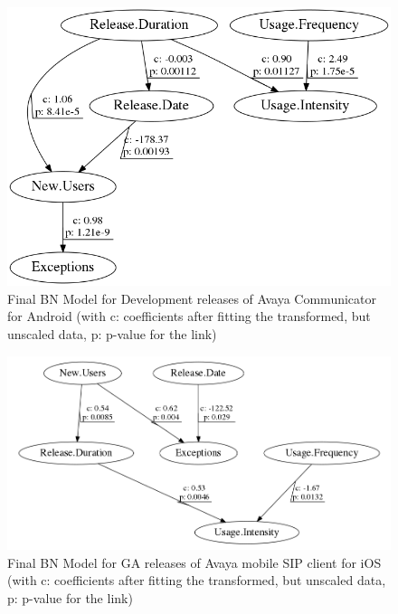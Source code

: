 \documentclass[smallextended]{svjour3}       %
\begin{document}
\begin{figure}[!t]
\centering
\includegraphics[width=0.7\linewidth]{AD}%
\caption{Final BN Model for Development releases of Avaya Communicator for Android (with c: coefficients after fitting the transformed, but unscaled data, p: p-value  for the link) }
\label{fig:finalAD}
\end{figure}

\begin{figure}[!t]
\centering
\includegraphics[width=0.7\linewidth]{i}%
\caption{Final BN Model for GA releases of Avaya mobile SIP client for iOS (with c: coefficients after fitting the transformed, but unscaled data, p: p-value  for the link) }
\label{fig:finalI}
\end{figure}
\end{document}
